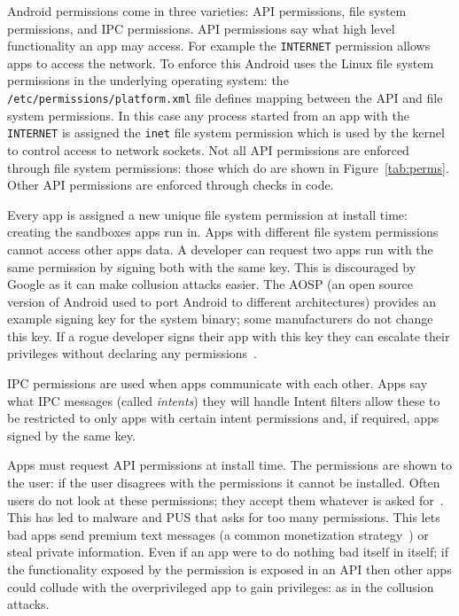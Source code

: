 \documentclass[a4paper]{article}
\begin{document}
Android permissions come in three varieties: API permissions, file system
permissions, and IPC permissions.  API permissions say what high level
functionality an app may access.  For example the \texttt{INTERNET} permission
allows apps to access the network.  To enforce this Android uses the
Linux file system permissions in the underlying operating system: the
\texttt{/etc/permissions/platform.xml} file defines mapping between the API
and file system permissions.  In this case any process started from an app with
the \texttt{INTERNET} is assigned the \texttt{inet} file system permission which
is used by the kernel to control access to network sockets.  Not all API
permissions are enforced through file system permissions: those which do are
shown in Figure~\ref{tab:perms}.  Other API permissions are enforced through
checks in code.  

Every app is assigned a new unique file system permission at install time:
creating the sandboxes apps run in.  Apps with different file system permissions
cannot access other apps data.  A developer can request two apps run with the
same permission by signing both with the same key.  This is discouraged by
Google as it can make collusion attacks easier.  The \ac{AOSP} (an open source
version of Android used to port Android to different architectures) provides an
example signing key for the system binary; some manufacturers do not change this
key.  If a rogue developer signs their app with this key they can escalate their
privileges without declaring any permissions~\cite{Zheng:vb}.

IPC permissions are used when apps communicate with each other.  Apps say what
IPC messages (called \emph{intents}) they will handle  Intent filters allow
these to be restricted to only apps with certain intent permissions and, if
required, apps signed by the same key.

Apps must request API permissions at install time.  The permissions are shown to
the user: if the user disagrees with the permissions it cannot be installed.
Often users do not look at these permissions; they accept them whatever is asked
for~\cite{Felt:2012hm}.  This has led to malware and \ac{PUS} that asks for too
many permissions. This lets bad apps send premium text messages (a common
monetization strategy~\cite{Chien:2011vw}) or steal private information.  Even
if an app were to do nothing bad itself in itself; if the functionality exposed
by the permission is exposed in an API then other apps could collude with the
overprivileged app to gain privileges: as in the collusion attacks.
\end{document}
